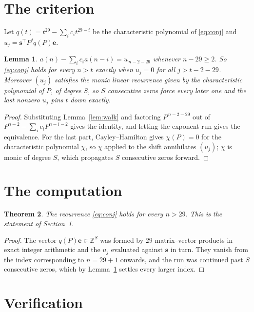 \documentclass[11pt,a4paper]{article}
\theoremstyle{plain}
\newtheorem{theorem}{Theorem}
\newtheorem{lemma}[theorem]{Lemma}
\theoremstyle{definition}
\begin{document}
\section{The criterion}

Let $q(t)=t^{29}-\sum_i c_i t^{29-i}$ be the characteristic polynomial of
\eqref{eq:conj} and $u_j=\mathbf{s}^{\!\top}P^{j}q(P)\mathbf{e}$.

\begin{lemma}\label{lem:crit}
$a(n)-\sum_i c_i a(n-i)=u_{\,n-2-29}$ whenever $n-29\ge2$. So \eqref{eq:conj}
holds for every $n>t$ exactly when $u_j=0$ for all $j>t-2-29$. Moreover $(u_j)$
satisfies the monic linear recurrence given by the characteristic polynomial of $P$, of
degree $S$, so $S$ consecutive zeros force every later one and the last nonzero $u_j$ pins
$t$ down exactly.
\end{lemma}

\begin{proof}
Substituting Lemma~\ref{lem:walk} and factoring $P^{\,n-2-29}$ out of
$P^{n-2}-\sum_i c_i P^{n-i-2}$ gives the identity, and letting the exponent run gives the
equivalence. For the last part, Cayley--Hamilton gives $\chi(P)=0$ for the characteristic
polynomial $\chi$, so $\chi$ applied to the shift annihilates $(u_j)$; $\chi$ is monic of
degree $S$, which propagates $S$ consecutive zeros forward.
\end{proof}

\section{The computation}

\begin{theorem}
The recurrence \eqref{eq:conj} holds for every $n>29$. This is the statement of
Section~1.
\end{theorem}

\begin{proof}
The vector $q(P)\mathbf{e}\in\mathbb{Z}^{S}$ was formed by $29$ matrix--vector
products in exact integer arithmetic and the $u_j$ evaluated against $\mathbf{s}$ in turn.
They vanish from the index corresponding to $n=29+1$ onwards, and the run was continued
past $S$ consecutive zeros, which by Lemma~\ref{lem:crit} settles every larger index.
\end{proof}

\section{Verification}
\end{document}
